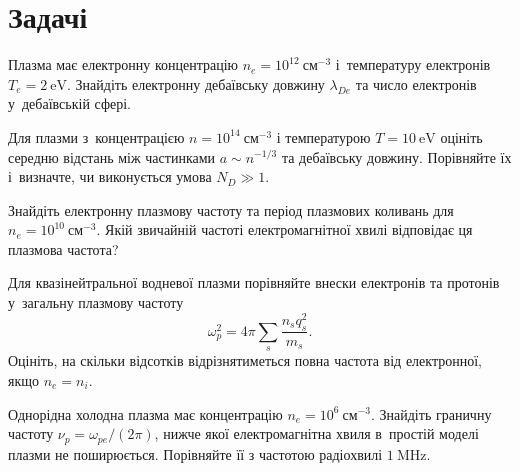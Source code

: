 \section*{Задачі}

\begin{problem}\label{prb:PlasmaDebye}
	 Плазма має електронну концентрацію $n_e=10^{12}~\mathrm{см}^{-3}$ і~температуру електронів $T_e=2~\mathrm{eV}$. Знайдіть електронну дебаївську довжину $\lambda_{De}$ та число електронів у~дебаївській сфері.
\end{problem}

\begin{problem}\label{prb:PlasmaCollective}
	 Для плазми з~концентрацією $n=10^{14}~\mathrm{см}^{-3}$ і температурою $T=10~\mathrm{eV}$ оцініть середню відстань між частинками $a\sim n^{-1/3}$ та дебаївську довжину. Порівняйте їх і~визначте, чи виконується умова $N_D\gg1$.
\end{problem}

\begin{problem}\label{prb:PlasmaFrequency}
	 Знайдіть електронну плазмову частоту та період плазмових коливань для $n_e=10^{10}~\mathrm{см}^{-3}$. Якій звичайній частоті електромагнітної хвилі відповідає ця плазмова частота?
\end{problem}

\begin{problem}\label{prb:PlasmaIons}
	 Для квазінейтральної водневої плазми порівняйте внески електронів та протонів у~загальну плазмову частоту
	\begin{equation*}
		\omega_p^2=4\pi\sum_s\frac{n_s q_s^2}{m_s}.
	\end{equation*}
	Оцініть, на скільки відсотків відрізнятиметься повна частота від електронної, якщо $n_e=n_i$.
\end{problem}

\begin{problem}\label{prb:PlasmaWave}
	 Однорідна холодна плазма має концентрацію $n_e=10^{6}~\mathrm{см}^{-3}$. Знайдіть граничну частоту $\nu_p=\omega_{pe}/(2\pi)$, нижче якої електромагнітна хвиля в~простій моделі плазми не поширюється. Порівняйте її з частотою радіохвилі $1~\mathrm{MHz}$.
\end{problem}

